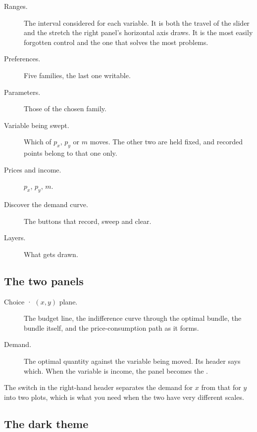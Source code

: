 \documentclass[11pt,a4paper]{appletmanual}
\begin{document}

\begin{description}
\item[Ranges.] The interval considered for each variable. It is both the travel
  of the slider and the stretch the right panel's horizontal axis draws. It is
  the most easily forgotten control and the one that solves the most problems.
\item[Preferences.] Five families, the last one writable.
\item[Parameters.] Those of the chosen family.
\item[Variable being swept.] Which of $p_x$, $p_y$ or $m$ moves. The other two
  are held fixed, and recorded points belong to that one only.
\item[Prices and income.] $p_x$, $p_y$, $m$.
\item[Discover the demand curve.] The buttons that record, sweep and clear.
\item[Layers.] What gets drawn.
\end{description}

\subsection{The two panels}

\begin{description}
\item[Choice · $(x, y)$ plane.] The budget line, the indifference curve through
  the optimal bundle, the bundle itself, and the price-consumption path as it
  forms.
\item[Demand.] The optimal quantity against the variable being moved. Its
  header says which. When the variable is income, the panel becomes the
  .
\end{description}

The  switch in the right-hand header separates the demand
for $x$ from that for $y$ into two plots, which is what you need when the two
have very different scales.


\subsection{The dark theme}
\end{document}
